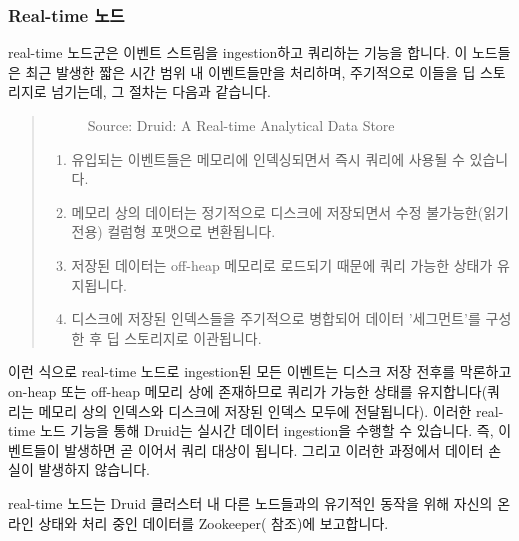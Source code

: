 \documentclass[letterpaper,10pt,english]{sphinxmanual}
\begin{document}
\subsubsection{Real-time 노드}
\label{\detokenize{discovery/part01/druid_nodes:real-time}}\label{\detokenize{discovery/part01/druid_nodes:realtime-nodes}}
real-time 노드군은 이벤트 스트림을 ingestion하고 쿼리하는 기능을 합니다. 이 노드들은 최근 발생한 짧은 시간 범위 내 이벤트들만을 처리하며, 주기적으로 이들을 딥 스토리지로 넘기는데, 그 절차는 다음과 같습니다.
\begin{quote}

\begin{figure}[H]
\centering
\capstart

\noindent{}
\caption{Source: Druid: A Real-time Analytical Data Store}\label{\detokenize{discovery/part01/druid_nodes:id5}}\end{figure}
\begin{enumerate}
\def\theenumi{\arabic{enumi}}
\def\labelenumi{\theenumi .}
\makeatletter\def\p@enumii{\p@enumi \theenumi .}\makeatother
\item {} 
유입되는 이벤트들은 메모리에 인덱싱되면서 즉시 쿼리에 사용될 수 있습니다.

\item {} 
메모리 상의 데이터는 정기적으로 디스크에 저장되면서 수정 불가능한(읽기 전용) 컬럼형 포맷으로 변환됩니다.

\item {} 
저장된 데이터는 off-heap 메모리로 로드되기 때문에 쿼리 가능한 상태가 유지됩니다.

\item {} 
디스크에 저장된 인덱스들을 주기적으로 병합되어 데이터 '세그먼트'를 구성한 후 딥 스토리지로 이관됩니다.

\end{enumerate}
\end{quote}

이런 식으로 real-time 노드로 ingestion된 모든 이벤트는 디스크 저장 전후를 막론하고 on-heap 또는 off-heap 메모리 상에 존재하므로 쿼리가 가능한 상태를 유지합니다(쿼리는 메모리 상의 인덱스와 디스크에 저장된 인덱스 모두에 전달됩니다). 이러한 real-time 노드 기능을 통해 Druid는 실시간 데이터 ingestion을 수행할 수 있습니다. 즉, 이벤트들이 발생하면 곧 이어서 쿼리 대상이 됩니다. 그리고 이러한 과정에서 데이터 손실이 발생하지 않습니다.

real-time 노드는 Druid 클러스터 내 다른 노드들과의 유기적인 동작을 위해 자신의 온라인 상태와 처리 중인 데이터를 Zookeeper({\hyperref[\detokenize{discovery/part01/druid_nodes:external-dependencies}]{}} 참조)에 보고합니다.
\end{document}
